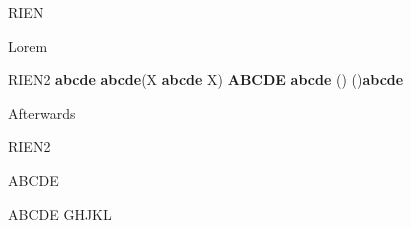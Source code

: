 \CDRDebugOn
\begin{CDRBlock}
RIEN
\end{CDRBlock}
Lorem
\begin{CDRBlock} [
  pygments=false,
  show spaces,
  tab size=3,
  escape inside=(),
]%
RIEN2
\textbf{abcde}
    \textbf{abcde}(X \textbf{abcde} X)  \textbf{ABCDE}
	\textbf{abcde}
	(\bgroup\color{red})	(\egroup)\textbf{abcde}
\end{CDRBlock}
\lipsum[3]
Afterwards
\typeout{-------------------}
\begin{CDRBlock}
RIEN2
\def\foo#1{
  \textbf{#1}
}
\end{CDRBlock}
ABCDE
\trivlist\item ABCDE
\endtrivlist
GHJKL
\endinput

\ExplSyntaxOff
\makeatother


